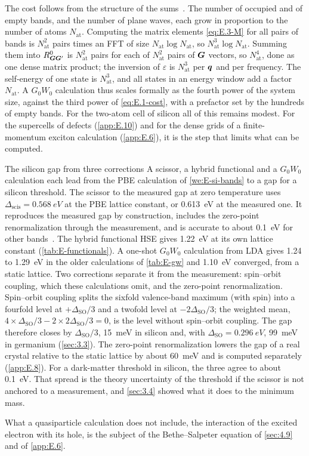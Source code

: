 The cost follows from the structure of the sums~\cite[Sect.~4]{deslippe2012berkeleygw}. The number of occupied and of empty bands, and the number of plane waves, each grow in proportion to the number of atoms $N_{\mathrm{at}}$. Computing the matrix elements \cref{eq:E.3-M} for all pairs of bands is $N_{\mathrm{at}}^2$ pairs times an FFT of size $N_{\mathrm{at}}\log N_{\mathrm{at}}$, so $N_{\mathrm{at}}^3\log N_{\mathrm{at}}$. Summing them into $R^0_{\bm{G}\bm{G}'}$ is $N_{\mathrm{at}}^2$ pairs for each of $N_{\mathrm{at}}^2$ pairs of $\bm{G}$ vectors, so $N_{\mathrm{at}}^4$, done as one dense matrix product; the inversion of $\varepsilon$ is $N_{\mathrm{at}}^3$ per $\bm{q}$ and per frequency. The self-energy of one state is $N_{\mathrm{at}}^3$, and all states in an energy window add a factor $N_{\mathrm{at}}$. A $G_0W_0$ calculation thus scales formally as the fourth power of the system size, against the third power of \cref{eq:E.1-cost}, with a prefactor set by the hundreds of empty bands. For the two-atom cell of silicon all of this remains modest. For the supercells of defects (\cref{app:E.10}) and for the dense grids of a finite-momentum exciton calculation (\cref{app:E.6}), it is the step that limits what can be computed.

\begin{workedexample}{The silicon gap from three corrections}\label{we:E-si-gap}
A scissor, a hybrid functional and a $G_0W_0$ calculation each lead from the PBE calculation of \cref{we:E-si-bands} to a gap for a silicon threshold. The scissor to the measured gap at zero temperature uses $\Delta_{\mathrm{scis}} = \SI{0.568}{eV}$ at the PBE lattice constant, or \SI{0.613}{eV} at the measured one. It reproduces the measured gap by construction, includes the zero-point renormalization through the measurement, and is accurate to about \SI{0.1}{eV} for other bands~\cite{godby1988self}. The hybrid functional HSE gives \SI{1.22}{eV} at its own lattice constant (\cref{tab:E-functionals}). A one-shot $G_0W_0$ calculation from LDA gives 1.24 to \SI{1.29}{eV} in the older calculations of \cref{tab:E-gw} and \SI{1.10}{eV} converged, from a static lattice. Two corrections separate it from the measurement: spin--orbit coupling, which these calculations omit, and the zero-point renormalization. Spin--orbit coupling splits the sixfold valence-band maximum (with spin) into a fourfold level at $+\Delta_{\mathrm{SO}}/3$ and a twofold level at $-2\Delta_{\mathrm{SO}}/3$; the weighted mean, $4\times\Delta_{\mathrm{SO}}/3 - 2\times2\Delta_{\mathrm{SO}}/3 = 0$, is the level without spin--orbit coupling. The gap therefore closes by $\Delta_{\mathrm{SO}}/3$, \SI{15}{meV} in silicon and, with $\Delta_{\mathrm{SO}} = \SI{0.296}{eV}$, \SI{99}{meV} in germanium (\cref{sec:3.3}). The zero-point renormalization lowers the gap of a real crystal relative to the static lattice by about \SI{60}{meV} and is computed separately (\cref{app:E.8}). For a dark-matter threshold in silicon, the three agree to about \SI{0.1}{eV}. That spread is the theory uncertainty of the threshold if the scissor is not anchored to a measurement, and \cref{sec:3.4} showed what it does to the minimum mass.
\end{workedexample}

What a quasiparticle calculation does not include, the interaction of the excited electron with its hole, is the subject of the Bethe--Salpeter equation of \cref{sec:4.9} and of \cref{app:E.6}.
